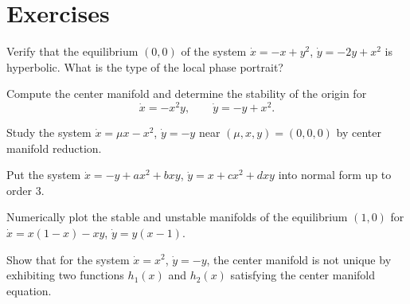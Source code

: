 \section{Exercises}

\begin{exercise}
Verify that the equilibrium $(0,0)$ of the system
$\dot{x} = -x + y^2$, $\dot{y} = -2y + x^2$ is hyperbolic.
What is the type of the local phase portrait?
\end{exercise}

\begin{exercise}
Compute the center manifold and determine the stability of the origin for
\[
    \dot{x} = -x^2y, \qquad \dot{y} = -y + x^2.
\]
\end{exercise}

\begin{exercise}
Study the system $\dot{x} = \mu x - x^2$, $\dot{y} = -y$ near
$(\mu, x, y) = (0, 0, 0)$ by center manifold reduction.
\end{exercise}

\begin{exercise}
Put the system $\dot{x} = -y + ax^2 + bxy$, $\dot{y} = x + cx^2 + dxy$
into normal form up to order 3.
\end{exercise}

\begin{exercise}
Numerically plot the stable and unstable manifolds of the equilibrium
$(1, 0)$ for $\dot{x} = x(1-x) - xy$, $\dot{y} = y(x - 1)$.
\end{exercise}

\begin{exercise}
Show that for the system $\dot{x} = x^2$, $\dot{y} = -y$, the center
manifold is not unique by exhibiting two functions $h_1(x)$ and $h_2(x)$
satisfying the center manifold equation.
\end{exercise}
